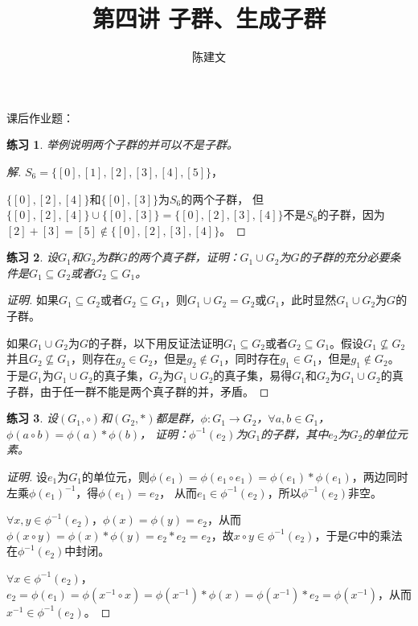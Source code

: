 \documentclass{article}
\newtheorem{Exercise}{练习}
\begin{document}
\begin{CJK*}{UTF8}{gbsn}
  \title{第四讲 子群、生成子群}
  \author{陈建文}
  \maketitle
 

课后作业题：
\begin{Exercise}
举例说明两个子群的并可以不是子群。
\end{Exercise}
\begin{proof}[解]
  $S_6=\{[0],[1],[2],[3],[4],[5]\}$，

  $\{[0],[2],[4]\}$和$\{[0],[3]\}$为$S_6$的两个子群，
  但$\{[0],[2],[4]\}\cup \{[0],[3]\}=\{[0],[2],[3],[4]\}$不是$S_6$的子群，因为$[2]+[3]=[5]\notin \{[0],[2],[3],[4]\}$。
\end{proof}
\begin{Exercise}
  设$G_1$和$G_2$为群$G$的两个真子群，证明：$G_1\cup G_2$为$G$的子群的充分必要条件是$G_1\subseteq G_2$或者$G_2\subseteq G_1$。
\end{Exercise}
\begin{proof}[证明]
  如果$G_1\subseteq G_2$或者$G_2\subseteq G_1$，则$G_1\cup G_2=G_2$或$G_1$，此时显然$G_1\cup G_2$为$G$的子群。

  如果$G_1\cup G_2$为$G$的子群，以下用反证法证明$G_1\subseteq G_2$或者$G_2\subseteq G_1$。假设$G_1\nsubseteq G_2$并且$G_2\nsubseteq G_1$，则存在$g_2\in G_2$，但是$g_2\notin G_1$，同时存在$g_1\in G_1$，但是$g_1\notin G_2$。
  于是$G_1$为$G_1\cup G_2$的真子集，$G_2$为$G_1\cup G_2$的真子集，易得$G_1$和$G_2$为$G_1\cup G_2$的真子群，由于任一群不能是两个真子群的并，矛盾。
\end{proof}
\begin{Exercise}
  设$(G_1,\circ)$和$(G_2,*)$都是群，$\phi:G_1\to G_2$，$\forall a,b\in G_1$，$\phi(a\circ b)=\phi(a)*\phi(b)$，
  证明：$\phi^{-1}(e_2)$为$G_1$的子群，其中$e_2$为$G_2$的单位元素。
\end{Exercise}
\begin{proof}[证明]
  设$e_1$为$G_1$的单位元，则$\phi(e_1)=\phi(e_1\circ e_1)=\phi(e_1)*\phi(e_1)$，两边同时左乘$\phi(e_1)^{-1}$，得$\phi(e_1)=e_2$，
  从而$e_1\in \phi^{-1}(e_2)$，所以$\phi^{-1}(e_2)$非空。

  $\forall x,y\in \phi^{-1}(e_2)$，$\phi(x)=\phi(y)=e_2$，从而$\phi(x\circ y)=\phi(x)*\phi(y)=e_2*e_2=e_2$，故$x\circ y\in \phi^{-1}(e_2)$，于是$G$中的乘法在$\phi^{-1}(e_2)$中封闭。

$\forall x\in \phi^{-1}(e_2)$，$e_2=\phi(e_1)=\phi(x^{-1}\circ x)=\phi(x^{-1})*\phi(x)=\phi(x^{-1})*e_2=\phi(x^{-1})$，从而$x^{-1}\in \phi^{-1}(e_2)$。


\end{proof}
\end{CJK*}
\end{document}
